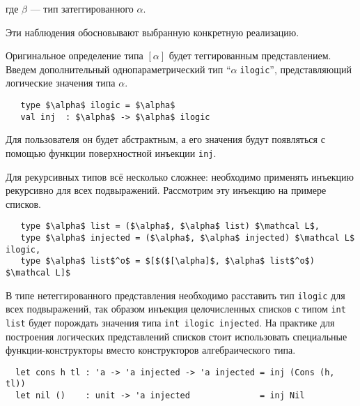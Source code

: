 \noindent где $\beta$ --- тип затеггированного $\alpha$.

Эти наблюдения обосновывают выбранную конкретную реализацию.

Оригинальное определение типа $[\alpha]$ будет теггированным представлением.
Введем дополнительный однопараметрический тип \enquote{$\alpha\;$\lstinline|ilogic|}, %
представляющий логические значения типа $\alpha$.


\begin{lstlisting}
   type $\alpha$ ilogic = $\alpha$
   val inj  : $\alpha$ -> $\alpha$ ilogic
\end{lstlisting}

\noindent Для пользователя он будет абстрактным, а его значения будут появляться с помощью функции поверхностной инъекции \lstinline=inj=.

Для рекурсивных типов всё несколько сложнее: необходимо применять инъекцию рекурсивно для всех подвыражений. Рассмотрим эту инъекцию на примере списков.

\begin{lstlisting}
   type $\alpha$ list = ($\alpha$, $\alpha$ list) $\mathcal L$,
   type $\alpha$ injected = ($\alpha$, $\alpha$ injected) $\mathcal L$ ilogic,
   type $\alpha$ list$^o$ = $[$($[\alpha]$, $\alpha$ list$^o$) $\mathcal L]$
\end{lstlisting}

\noindent В типе нетеггированного представления необходимо расставить тип \lstinline=ilogic= для всех подвыражений, так образом инъекция целочисленных списков с типом \lstinline=int list= будет порождать значения типа \lstinline=int ilogic injected=.
На практике для построения логических представлений списков стоит использовать специальные функции-конструкторы вместо конструкторов алгебраического типа.
\begin{lstlisting}
  let cons h tl : 'a -> 'a injected -> 'a injected = inj (Cons (h, tl))
  let nil ()    : unit -> 'a injected              = inj Nil
\end{lstlisting}


